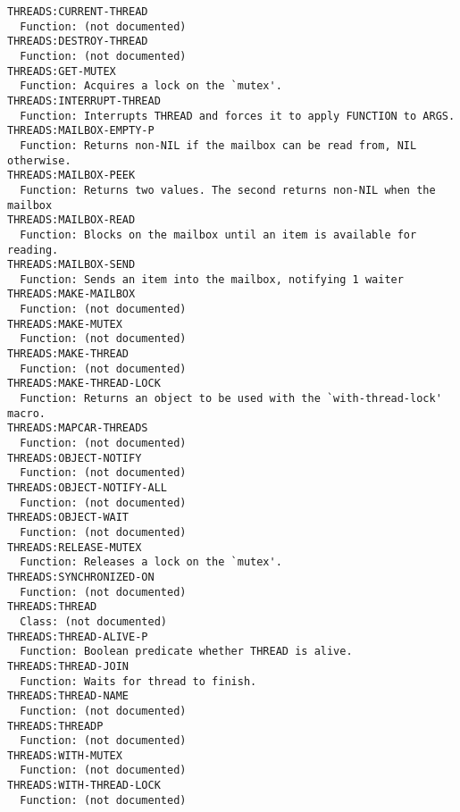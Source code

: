 \begin{verbatim}
THREADS:CURRENT-THREAD
  Function: (not documented)
THREADS:DESTROY-THREAD
  Function: (not documented)
THREADS:GET-MUTEX
  Function: Acquires a lock on the `mutex'.
THREADS:INTERRUPT-THREAD
  Function: Interrupts THREAD and forces it to apply FUNCTION to ARGS.
THREADS:MAILBOX-EMPTY-P
  Function: Returns non-NIL if the mailbox can be read from, NIL otherwise.
THREADS:MAILBOX-PEEK
  Function: Returns two values. The second returns non-NIL when the mailbox
THREADS:MAILBOX-READ
  Function: Blocks on the mailbox until an item is available for reading.
THREADS:MAILBOX-SEND
  Function: Sends an item into the mailbox, notifying 1 waiter
THREADS:MAKE-MAILBOX
  Function: (not documented)
THREADS:MAKE-MUTEX
  Function: (not documented)
THREADS:MAKE-THREAD
  Function: (not documented)
THREADS:MAKE-THREAD-LOCK
  Function: Returns an object to be used with the `with-thread-lock' macro.
THREADS:MAPCAR-THREADS
  Function: (not documented)
THREADS:OBJECT-NOTIFY
  Function: (not documented)
THREADS:OBJECT-NOTIFY-ALL
  Function: (not documented)
THREADS:OBJECT-WAIT
  Function: (not documented)
THREADS:RELEASE-MUTEX
  Function: Releases a lock on the `mutex'.
THREADS:SYNCHRONIZED-ON
  Function: (not documented)
THREADS:THREAD
  Class: (not documented)
THREADS:THREAD-ALIVE-P
  Function: Boolean predicate whether THREAD is alive.
THREADS:THREAD-JOIN
  Function: Waits for thread to finish.
THREADS:THREAD-NAME
  Function: (not documented)
THREADS:THREADP
  Function: (not documented)
THREADS:WITH-MUTEX
  Function: (not documented)
THREADS:WITH-THREAD-LOCK
  Function: (not documented)
\end{verbatim}
